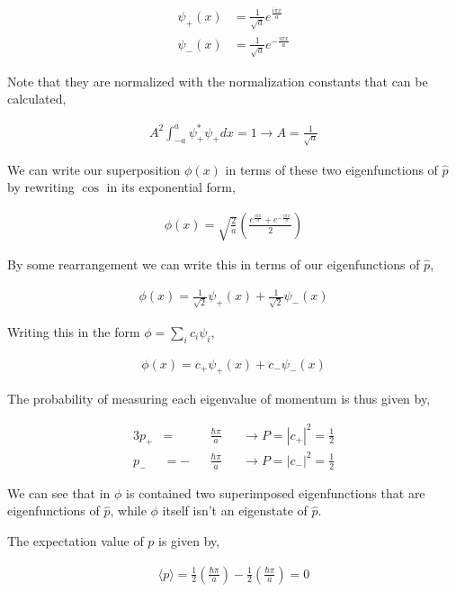 \documentclass[11pt]{amsart}
\begin{document}
\begin{align*}
  \psi_+(x) &= \frac{1}{\sqrt{a}} e^{\frac{i\pi x}{a}} \\
  \psi_-(x) &= \frac{1}{\sqrt{a}} e^{-\frac{i\pi x}{a}}
\end{align*}

Note that they are normalized with the normalization constants that can be calculated,

\begin{align*}
  A^2 \int_{-a}^{a} \psi_+^* \psi_+ dx = 1 \to A = \frac{1}{\sqrt{a}}
\end{align*}

We can write our superposition $\phi(x)$ in terms of these two eigenfunctions of $\hat{p}$ by rewriting $\cos$ in its exponential form,

\begin{align*}
  \phi(x) = \sqrt{\frac{2}{a}} \left(\frac{e^{\frac{i\pi x}{a}} + e^{-\frac{i\pi x}{a}}}{2}\right)
\end{align*}

By some rearrangement we can write this in terms of our eigenfunctions of $\hat{p}$,

\begin{align*}
  \phi(x) = \frac{1}{\sqrt{2}} \psi_+(x) + \frac{1}{\sqrt{2}} \psi_-(x)
\end{align*}

Writing this in the form $\phi = \sum\limits_i c_i \psi_i$,

\begin{align*}
  \phi(x) = c_+ \psi_+(x) + c_- \psi_-(x)
\end{align*}

The probability of measuring each eigenvalue of momentum is thus given by,

\begin{alignat*}{3}
  p_+ &= &&\frac{\hbar\pi}{a}  &&\to P = {|c_+|}^2 = \frac{1}{2} \\
  p_- &= -&&\frac{\hbar\pi}{a} &&\to P = {|c_-|}^2 = \frac{1}{2}
\end{alignat*}

We can see that in $\phi$ is contained two superimposed eigenfunctions that are eigenfunctions of $\hat{p}$, while $\phi$ itself isn't an eigenstate of $\hat{p}$.

The expectation value of $p$ is given by,

\begin{align*}
  \langle p \rangle = \frac{1}{2}\left(\frac{\hbar\pi}{a}\right) - \frac{1}{2}\left(\frac{\hbar\pi}{a}\right) = 0
\end{align*}
\end{document}
